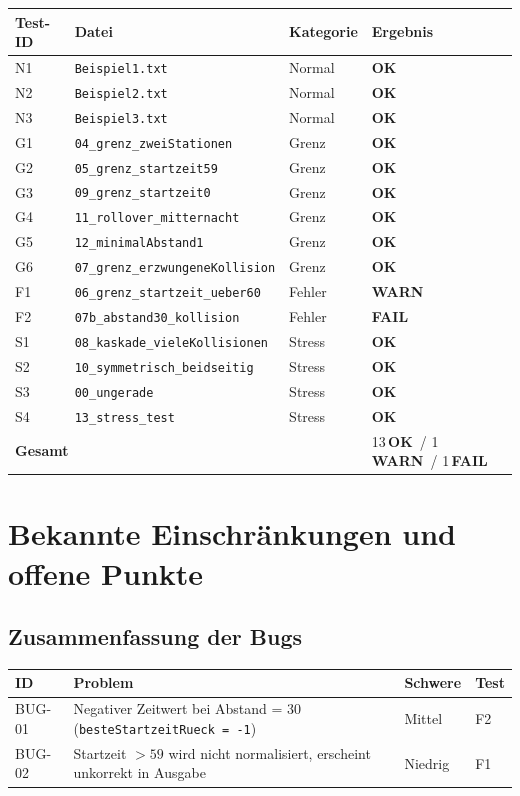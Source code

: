 \documentclass[12pt,a4paper]{article}
\newcommand{\pass}{\textcolor{passgreen}{\textbf{OK}}}
\newcommand{\fail}{\textcolor{failred}{\textbf{FAIL}}}
\newcommand{\warn}{\textcolor{warnorng}{\textbf{WARN}}}
\begin{document}
\begin{center}
\begin{tabular}{llll}
\toprule
\textbf{Test-ID} & \textbf{Datei} & \textbf{Kategorie} & \textbf{Ergebnis} \\
\midrule
N1 & \texttt{Beispiel1.txt} & Normal & \pass \\
N2 & \texttt{Beispiel2.txt} & Normal & \pass \\
N3 & \texttt{Beispiel3.txt} & Normal & \pass \\
G1 & \texttt{04\_grenz\_zweiStationen} & Grenz & \pass \\
G2 & \texttt{05\_grenz\_startzeit59} & Grenz & \pass \\
G3 & \texttt{09\_grenz\_startzeit0} & Grenz & \pass \\
G4 & \texttt{11\_rollover\_mitternacht} & Grenz & \pass \\
G5 & \texttt{12\_minimalAbstand1} & Grenz & \pass \\
G6 & \texttt{07\_grenz\_erzwungeneKollision} & Grenz & \pass \\
F1 & \texttt{06\_grenz\_startzeit\_ueber60} & Fehler & \warn \\
F2 & \texttt{07b\_abstand30\_kollision} & Fehler & \fail \\
S1 & \texttt{08\_kaskade\_vieleKollisionen} & Stress & \pass \\
S2 & \texttt{10\_symmetrisch\_beidseitig} & Stress & \pass \\
S3 & \texttt{00\_ungerade} & Stress & \pass \\
S4 & \texttt{13\_stress\_test} & Stress & \pass \\
\midrule
\multicolumn{3}{l}{\textbf{Gesamt}} & 13\,\pass\ / 1\,\warn\ / 1\,\fail \\
\bottomrule
\end{tabular}
\end{center}

\section{Bekannte Einschränkungen und offene Punkte}

\subsection{Zusammenfassung der Bugs}

\begin{center}
\begin{tabular}{lp{6cm}ll}
\toprule
\textbf{ID} & \textbf{Problem} & \textbf{Schwere} & \textbf{Test} \\
\midrule
BUG-01 & Negativer Zeitwert bei Abstand = 30 (\texttt{besteStartzeitRueck = -1}) & Mittel & F2 \\
BUG-02 & Startzeit $> 59$ wird nicht normalisiert, erscheint unkorrekt in Ausgabe & Niedrig & F1 \\
\bottomrule
\end{tabular}
\end{center}
\end{document}
